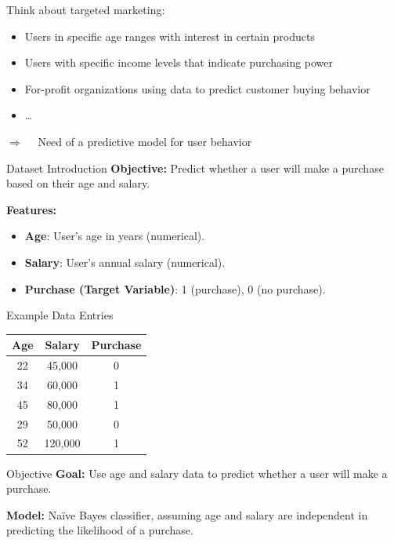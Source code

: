 
{
	Think about targeted marketing:
	
	\begin{itemize}
		\item Users in specific age ranges with interest in certain products
		\item Users with specific income levels that indicate purchasing power
		\item  For-profit organizations using data to predict customer buying behavior
		\item \ldots
	\end{itemize}
	
	\bigskip
	
	$\Rightarrow\quad$ Need of a predictive model for user behavior
}  






{
	
	
	\begin{frame}{Dataset Introduction}
		\textbf{Objective:} Predict whether a user will make a purchase based on their age and salary.
		
		\textbf{Features:}
		\begin{itemize}
			\item \textbf{Age}: User’s age in years (numerical).
			\item \textbf{Salary}: User’s annual salary (numerical).
			\item \textbf{Purchase (Target Variable)}: 1 (purchase), 0 (no purchase).
		\end{itemize}
	\end{frame}
	
	\begin{frame}{Example Data Entries}
		\begin{tabular}{|c|c|c|}
			\hline
			\textbf{Age} & \textbf{Salary} & \textbf{Purchase} \\
			\hline
			22 & 45,000 & 0 \\
			34 & 60,000 & 1 \\
			45 & 80,000 & 1 \\
			29 & 50,000 & 0 \\
			52 & 120,000 & 1 \\
			\hline
		\end{tabular}
	\end{frame}
	
	\begin{frame}{Objective}
		\textbf{Goal:} Use age and salary data to predict whether a user will make a purchase.
		
		\textbf{Model:} Naïve Bayes classifier, assuming age and salary are independent in predicting the likelihood of a purchase.
	\end{frame}
	
}



